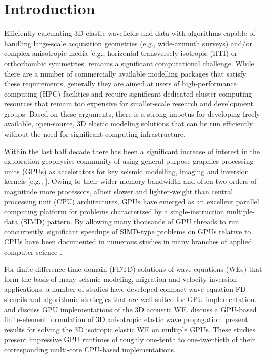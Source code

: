 \section{Introduction}

Efficiently calculating 3D elastic wavefields and data with algorithms capable of handling large-scale acquisition geometries (e.g., wide-azimuth surveys) and/or complex anisotropic media [e.g., horizontal transversely isotropic (HTI) or orthorhombic symmetries] remains a significant computational challenge.   While there are a number of commercially available modelling packages that satisfy these requirements, generally they are aimed at users of high-performance computing (HPC) facilities and require significant dedicated cluster computing resources that remain too expensive for smaller-scale research and development groups.  Based on these arguments, there is a strong impetus for developing freely available, open-source, 3D elastic modeling solutions that can be run efficiently without the need for significant computing infrastructure.

Within the last half decade there has been a significant increase of interest in the exploration geophysics community of using general-purpose graphics processing units (GPUs) as accelerators for key seismic modelling, imaging and inversion kernels [e.g., \cite{Ohmer,kuzma,Morton2008,foltinek}].  Owing to their wider memory bandwidth and often two orders of magnitude more processors, albeit slower and lighter-weight than central processing unit (CPU) architectures, GPUs have emerged as an excellent parallel computing platform for problems characterized by a single-instruction multiple-data (SIMD) pattern.  By allowing many thousands of GPU threads to run concurrently, significant speedups of SIMD-type problems on GPUs relative to CPUs have been documented in numerous studies in many branches of applied computer science \cite[]{GPUGEMS2,GPUGEMS3}.

For finite-difference time-domain (FDTD) solutions of wave equations (WEs) that form the basis of many seismic modeling, migration and velocity inversion applications, a number of studies have developed compact wave-equation FD stencils and algorithmic strategies that are well-suited for GPU implementation.  \cite{Micikevicius} and \cite{Abdelkhalek} discuss GPU implementations of the 3D acoustic WE.  \cite{Komatitsch} discuss a GPU-based finite-element formulation of 3D anisotropic elastic wave propagation.  \cite{Nakata} present results for solving the 3D isotropic elastic WE on multiple GPUs.  These studies present impressive GPU runtimes of roughly one-tenth to one-twentieth of their corresponding multi-core CPU-based implementations.

